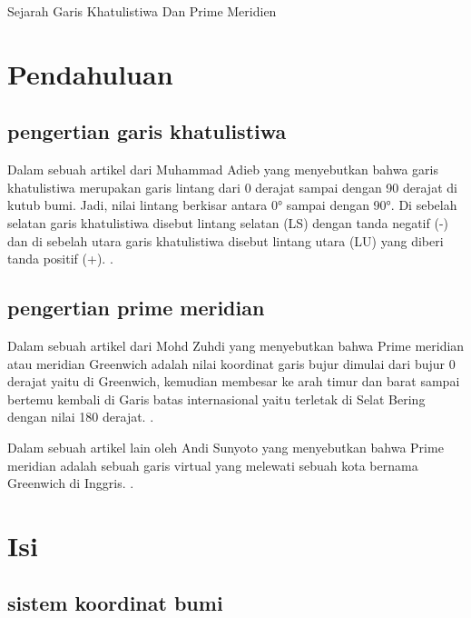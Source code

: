    
								   
								   
												           Sejarah Garis Khatulistiwa Dan Prime Meridien

														   
\section {Pendahuluan}

\subsection{pengertian garis khatulistiwa}	

	Dalam sebuah artikel dari Muhammad Adieb yang menyebutkan bahwa garis khatulistiwa merupakan garis lintang dari 0 derajat sampai dengan 90 derajat 
di kutub bumi. Jadi, nilai lintang berkisar antara 0° sampai dengan 90°. Di sebelah selatan garis khatulistiwa disebut lintang selatan (LS) dengan 
tanda negatif (-) dan di sebelah utara garis khatulistiwa disebut lintang utara (LU) yang diberi tanda positif (+). \cite {adieb2014studi}.

\subsection{pengertian prime meridian}
	
	Dalam sebuah artikel dari Mohd Zuhdi yang menyebutkan bahwa Prime meridian atau meridian Greenwich adalah nilai koordinat garis bujur dimulai dari 
bujur 0 derajat yaitu di Greenwich, kemudian membesar ke arah timur dan barat sampai bertemu kembali di Garis batas internasional yaitu terletak 
di Selat Bering dengan nilai 180 derajat. \cite {zuhdi2012sistem}.

	Dalam sebuah artikel lain oleh Andi Sunyoto yang menyebutkan bahwa Prime meridian adalah sebuah garis virtual yang melewati sebuah kota 
bernama Greenwich di Inggris. \cite{sunyoto2009api}.

\section {Isi}

\subsection{sistem koordinat bumi}
	
